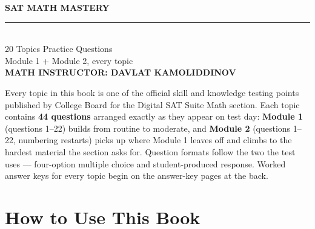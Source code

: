 \documentclass[11pt,a4paper,oneside]{book}
\begin{document}
\thispagestyle{plain}
\settopicname{}
\vspace*{1.2cm}
\begin{center}
  {\Huge\bfseries\color{keycolor} SAT MATH MASTERY}\\[10pt]
  {\color{keycolor}\rule{9cm}{2pt}}\\[14pt]
  {\Large\color{inkgray} 20 Topics \quad\textbullet{} Practice Questions}\\[6pt]
  {\large\color{inkgray} Module 1 + Module 2, every topic}\\[26pt]
  {\large\bfseries\color{keycolor} MATH INSTRUCTOR: DAVLAT KAMOLIDDINOV}
\end{center}

\vfill
\begin{center}
\begin{minipage}{0.86\textwidth}
\small\color{inkgray}
Every topic in this book is one of the official skill and knowledge testing
points published by College Board for the Digital SAT Suite Math section.
Each topic contains \textbf{44 questions} arranged exactly as they appear on
test day: \textbf{Module 1} (questions 1--22) builds from routine to
moderate, and \textbf{Module 2} (questions 1--22, numbering restarts) picks
up where Module 1 leaves off and climbs to the hardest material the section
asks for. Question formats follow the two the test uses --- four-option
multiple choice and student-produced response. Worked answer keys for every
topic begin on the answer-key pages at the back.
\end{minipage}
\end{center}
\vspace{1.4cm}
\clearpage

\renewcommand{\contentsname}{\color{keycolor}Contents}
\tableofcontents
\clearpage

\chapter*{How to Use This Book}
\end{document}
